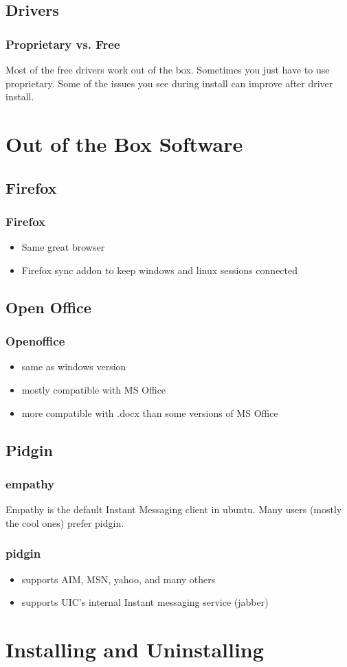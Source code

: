 \documentclass[hyperref={pdfpagelabels=false}]{beamer}
\begin{document}
\subsection{Drivers}
\frame
{
	\frametitle{Proprietary vs. Free}
	Most of the free drivers work out of the box. Sometimes you just have to
use proprietary. Some of the issues you see during install can improve after driver install.
}
\section{Out of the Box Software}
\subsection{Firefox}
\frame
{
    \frametitle{Firefox}
    \begin{itemize}
    \item{Same great browser}
    \item{Firefox sync addon to keep windows and linux sessions connected}
    \end{itemize}
}
\subsection{Open Office}
\frame
{
    \frametitle{Openoffice}
    \begin{itemize}
    \item{same as windows version}
    \item{mostly compatible with MS Office}
    \item{more compatible with .docx than some versions of MS Office}
    \end{itemize}
}
\subsection{Pidgin}
\frame
{
	\frametitle{empathy}
	Empathy is the default Instant Messaging client in ubuntu.
        Many users (mostly the cool ones) prefer pidgin.
}
\frame
{
	\frametitle{pidgin}
	\begin{itemize}
	\item{supports AIM, MSN, yahoo, and many others}
	\item{supports UIC's internal Instant messaging service (jabber)}
	\end{itemize}
}
\section{Installing and Uninstalling}
\end{document}
